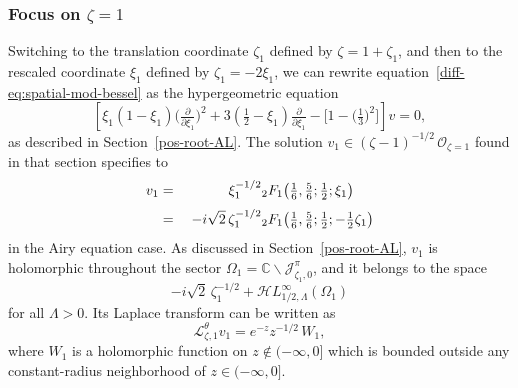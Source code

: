\documentclass{article}
\newcommand{\singexp}[2]{\mathcal{H}L^\infty_{#1, #2}}
\newcommand{\C}{\mathbb{C}}
\newcommand{\laplace}{\mathcal{L}}
\theoremstyle{definition}
\theoremstyle{plain}
\newenvironment{revised}{\color{DarkBlue}}{\color{black}}
\begin{document}
\subsubsection{Focus on $\zeta = 1$}\label{pos-root}
%
\begin{revised}
Switching to the translation coordinate $\zeta_1$ defined by $\zeta = 1 + \zeta_1$, and then to the rescaled coordinate $\xi_1$ defined by $\zeta_1 = -2\xi_1$, we can rewrite equation~\eqref{diff-eq:spatial-mod-bessel} as the hypergeometric equation
\begin{equation}%
\left[\xi_1 (1 - \xi_1) \big(\tfrac{\partial}{\partial \xi_1}\big)^2 + 3(\tfrac{1}{2} - \xi_1) \tfrac{\partial}{\partial \xi_1} - \big[1 - \big(\tfrac{1}{3}\big)^2\big]\right] v = 0,
\end{equation}
as described in Section~\ref{pos-root-AL}. The solution $v_1 \in (\zeta-1)^{-1/2}\,\mathcal{O}_{\zeta=1}$ found in that section specifies to
\begin{alignat*}{2}
v_1 &=\;& \hphantom{-i\sqrt{2}}\,\xi_1^{-1/2} & {}_2F_1\big(\tfrac{1}{6}, \tfrac{5}{6}; \tfrac{1}{2}; \xi_1\big) \\[1mm]
&=\;& -i\sqrt{2}\,\zeta_1^{-1/2} & {}_2F_1\big(\tfrac{1}{6}, \tfrac{5}{6}; \tfrac{1}{2}; -\tfrac{1}{2}\zeta_1\big)
\end{alignat*}
in the Airy equation case. As discussed in Section~\ref{pos-root-AL}, $v_1$ is holomorphic throughout the sector $\Omega_1 = \C \smallsetminus \mathcal{J}^\pi_{\zeta_1, 0}$, and it belongs to the space
\[ -i\sqrt{2}\,\zeta_1^{-1/2} + \singexp{1/2}{\Lambda}(\Omega_1) \]
for all $\Lambda > 0$. Its Laplace transform can be written as
\[ \laplace^\theta_{\zeta, 1} v_1 = e^{-z} z^{-1/2}\,W_1, \]
where $W_1$ is a holomorphic function on $z \notin (-\infty, 0]$ which is bounded outside any constant-radius neighborhood of $z \in (-\infty, 0]$.
\end{revised}
%
\end{document}

